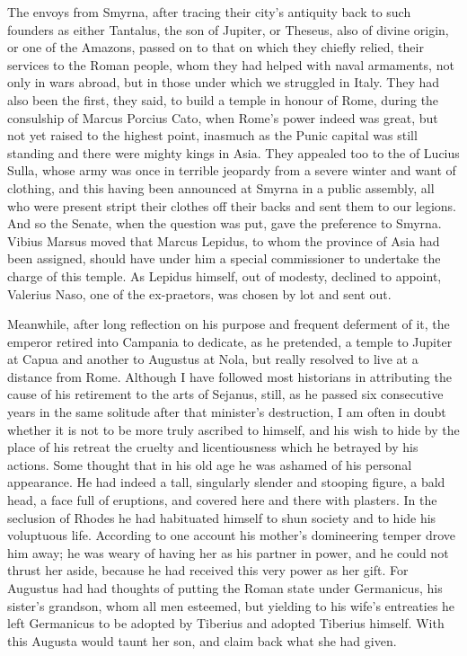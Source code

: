 
The envoys from Smyrna, after tracing their city's antiquity back to such founders as either Tantalus, the son of Jupiter, or Theseus, also of divine origin, or one of the Amazons, passed on to that on which they chiefly relied, their services to the Roman people, whom they had helped with naval armaments, not only in wars abroad, but in those under which we struggled in Italy. They had also been the first, they said, to build a temple in honour of Rome, during the consulship of Marcus Porcius Cato, when Rome's power indeed was great, but not yet raised to the highest point, inasmuch as the Punic capital was still standing and there were mighty kings in Asia. They appealed too to the of Lucius Sulla, whose army was once in terrible jeopardy from a severe winter and want of clothing, and this having been announced at Smyrna in a public assembly, all who were present stript their clothes off their backs and sent them to our legions. And so the Senate, when the question was put, gave the preference to Smyrna. Vibius Marsus moved that Marcus Lepidus, to whom the province of Asia had been assigned, should have under him a special commissioner to undertake the charge of this temple. As Lepidus himself, out of modesty, declined to appoint, Valerius Naso, one of the ex-praetors, was chosen by lot and sent out.


Meanwhile, after long reflection on his purpose and frequent deferment of it, the emperor retired into Campania to dedicate, as he pretended, a temple to Jupiter at Capua and another to Augustus at Nola, but really resolved to live at a distance from Rome. Although I have followed most historians in attributing the cause of his retirement to the arts of Sejanus, still, as he passed six consecutive years in the same solitude after that minister's destruction, I am often in doubt whether it is not to be more truly ascribed to himself, and his wish to hide by the place of his retreat the cruelty and licentiousness which he betrayed by his actions. Some thought that in his old age he was ashamed of his personal appearance. He had indeed a tall, singularly slender and stooping figure, a bald head, a face full of eruptions, and covered here and there with plasters. In the seclusion of Rhodes he had habituated himself to shun society and to hide his voluptuous life. According to one account his mother's domineering temper drove him away; he was weary of having her as his partner in power, and he could not thrust her aside, because he had received this very power as her gift. For Augustus had had thoughts of putting the Roman state under Germanicus, his sister's grandson, whom all men esteemed, but yielding to his wife's entreaties he left Germanicus to be adopted by Tiberius and adopted Tiberius himself. With this Augusta would taunt her son, and claim back what she had given.

